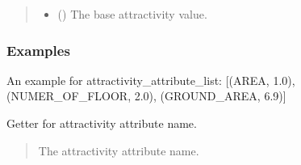 \documentclass[letterpaper,10pt,english]{sphinxmanual}
\begin{document}
\begin{fulllineitems}
\begin{fulllineitems}
\begin{quote}
\begin{description}
\begin{itemize}
\item {} 
\sphinxAtStartPar
{} () \textendash{} The base attractivity value.

\end{itemize}

\end{description}\end{quote}
\subsubsection*{Examples}

\sphinxAtStartPar
An example for attractivity\_attribute\_list: {[}(AREA, 1.0), (NUMER\_OF\_FLOOR, 2.0), (GROUND\_AREA, 6.9){]}

\end{fulllineitems}


\begin{fulllineitems}
\label{\detokenize{apidoc/src.osm_configurator.model.project.configuration:src.osm_configurator.model.project.configuration.attractivity_attribute.AttractivityAttribute.get_attractivity_attribute_name}}
\pysigstartsignatures
{}
\pysigstopsignatures
\sphinxAtStartPar
Getter for attractivity attribute name.
\begin{quote}\begin{description}
\sphinxAtStartPar
The attractivity attribute name.

\sphinxAtStartPar
{}

\end{description}\end{quote}

\end{fulllineitems}



\end{fulllineitems}
\end{document}
